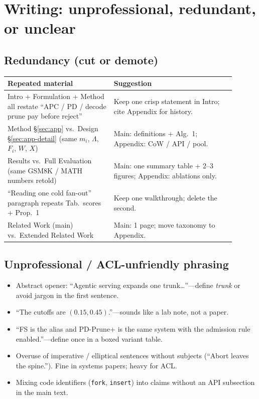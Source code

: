 \documentclass[11pt]{article}
\newcommand{\plus}{\textsf{PD-Prune+}}
\newcommand{\Work}{W}
\newcommand{\Xfer}{X}
\begin{document}
\section{Writing: unprofessional, redundant, or unclear}

\subsection{Redundancy (cut or demote)}
\begin{center}
\small
\begin{tabular}{@{}p{0.42\linewidth}p{0.48\linewidth}@{}}
\toprule
Repeated material & Suggestion \\
\midrule
Intro + Formulation + Method all restate
``APC / PD / decode prune pay before reject''
& Keep one crisp statement in Intro; cite Appendix for history. \\
\midrule
Method \S\ref{sec:app} vs.\ Design \S\ref{sec:app-detail}
(same $m_i$, $\Lambda$, $F_i$, $\Work$, $\Xfer$)
& Main: definitions + Alg.~1; Appendix: CoW / API / pool. \\
\midrule
Results vs.\ Full Evaluation
(same GSM8K / MATH numbers retold)
& Main: one summary table + 2--3 figures;
Appendix: ablations only. \\
\midrule
``Reading one cold fan-out'' paragraph
repeats Tab.~scores + Prop.~1
& Keep one walkthrough; delete the second. \\
\midrule
Related Work (main) vs.\ Extended Related Work
& Main: 1 page; move taxonomy to Appendix. \\
\bottomrule
\end{tabular}
\end{center}

\subsection{Unprofessional / ACL-unfriendly phrasing}
\begin{itemize}
  \item Abstract opener: ``Agentic serving expands one trunk\ldots''---define
        \emph{trunk} or avoid jargon in the first sentence.
  \item ``The cutoffs are $(0.15,0.45)$.''---sounds like a lab note, not a paper.
  \item ``FS is the alias and \plus{} is the same system with the admission
        rule enabled.''---define once in a boxed variant table.
  \item Overuse of imperative / elliptical sentences without subjects
        (``Abort leaves the spine.''). Fine in systems papers; heavy for ACL.
  \item Mixing code identifiers (\texttt{fork}, \texttt{insert}) into claims
        without an API subsection in the main text.
\end{itemize}
\end{document}
